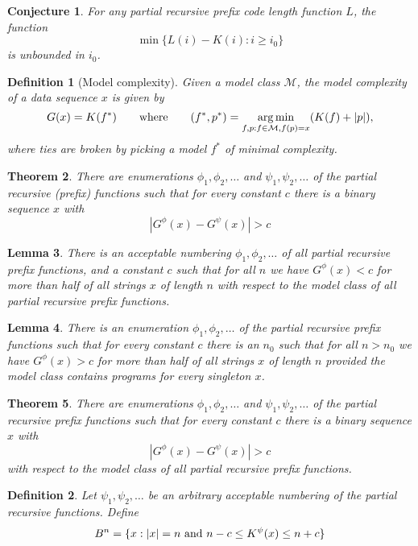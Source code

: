 \documentclass{article}
\newtheorem{theorem}{Theorem}
\newtheorem{lemma}[theorem]{Lemma}
\newtheorem{conjecture}[theorem]{Conjecture}
\newtheorem{definition}{Definition}
\newcommand{\M}{\mathcal M}
\newcommand{\tn}[1]{\textnormal{#1}}
\newcommand{\argmin}{\mathop{\arg\min}}
\begin{document}
\begin{conjecture}
For any partial recursive prefix code length function $L$, the function
\[
\min\{L(i)-K(i):i\ge i_0\}
\]
is unbounded in $i_0$.
\end{conjecture}

\begin{definition}[Model complexity]
Given a model class $\M$, the model complexity of a data sequence $x$ is given by
\[G(x)=K(f^*)\qquad\tn{where}\qquad (f^*,p^*)=\argmin_{f,p:f\in\M, f(p)=x}(K(f)+|p|),
\]
where ties are broken by picking a model $f^*$ of minimal complexity.
\end{definition}

\begin{theorem}
There are enumerations $\phi_1,\phi_2,\ldots$ and $\psi_1,\psi_2,\ldots$ of the partial recursive (prefix) functions such that for every constant $c$ there is a binary sequence $x$ with
\[
|G^\phi(x)-G^\psi(x)|>c
\]
\end{theorem}

\begin{lemma}
There is an acceptable numbering $\phi_1,\phi_2,\ldots$ of all partial recursive prefix functions, and a constant $c$ such that for all $n$ we have $G^\phi(x)<c$ for more than half of all strings $x$ of length $n$ with respect to the model class of all partial recursive prefix functions.
\end{lemma}

\begin{lemma}
There is an enumeration $\phi_1,\phi_2,\ldots$ of the partial recursive prefix functions such that for every constant $c$ there is an $n_0$ such that for all $n>n_0$ we have $G^\phi(x)>c$ for more than half of all strings $x$ of length $n$ provided the model class contains programs for every singleton $x$.
\end{lemma}

\begin{theorem}
There are enumerations $\phi_1,\phi_2,\ldots$ and $\psi_1,\psi_2,\ldots$ of the partial recursive prefix functions such that for every constant $c$ there is a binary sequence $x$ with
\[
|G^\phi(x)-G^\psi(x)|>c
\]
with respect to the model class of all partial recursive prefix functions.
\end{theorem}


\begin{definition}
Let $\psi_1,\psi_2,\ldots$ be an arbitrary acceptable numbering of the partial recursive functions. Define
\[
B^n = \{ x : |x|=n~\tn{and}~n-c \le K^\psi(x) \le n+c \}
\]
\end{definition}
\end{document}
